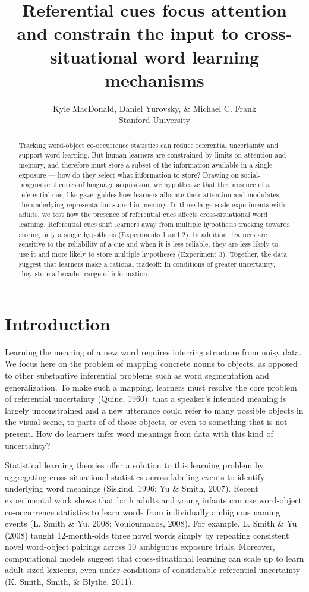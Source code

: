 \documentclass[12pt,]{article}
\title{Referential cues focus attention and constrain the input to
cross-situational word learning mechanisms}
\author{Kyle MacDonald, Daniel Yurovsky, \& Michael C. Frank\\Stanford
University}
\date{}
\begin{document}
\maketitle

\begin{abstract}
Tracking word-object co-occurrence statistics can reduce referential
uncertainty and support word learning. But human learners are
constrained by limits on attention and memory, and therefore must store
a subset of the information available in a single exposure --- how do
they select what information to store? Drawing on social-pragmatic
theories of language acquisition, we hypothesize that the presence of a
referential cue, like gaze, guides how learners allocate their attention
and modulates the underlying representation stored in memory. In three
large-scale experiments with adults, we test how the presence of
referential cues affects cross-situational word learning. Referential
cues shift learners away from multiple hypothesis tracking towards
storing only a single hypothesis (Experiments 1 and 2). In addition,
learners are sensitive to the reliability of a cue and when it is less
reliable, they are less likely to use it and more likely to store
multiple hypotheses (Experiment 3). Together, the data suggest that
learners make a rational tradeoff: In conditions of greater uncertainty,
they store a broader range of information.
\end{abstract}

\newpage

\section{Introduction}\label{introduction}

Learning the meaning of a new word requires inferring structure from
noisy data. We focus here on the problem of mapping concrete nouns to
objects, as opposed to other substantive inferential problems such as
word segmentation and generalization. To make such a mapping, learners
must resolve the core problem of referential uncertainty (Quine, 1960):
that a speaker's intended meaning is largely unconstrained and a new
utterance could refer to many possible objects in the visual scene, to
parts of of those objects, or even to something that is not present. How
do learners infer word meanings from data with this kind of uncertainty?

Statistical learning theories offer a solution to this learning problem
by aggregating cross-situational statistics across labeling events to
identify underlying word meanings (Siskind, 1996; Yu \& Smith, 2007).
Recent experimental work shows that both adults and young infants can
use word-object co-occurrence statistics to learn words from
individually ambiguous naming events (L. Smith \& Yu, 2008; Vouloumanos,
2008). For example, L. Smith \& Yu (2008) taught 12-month-olds three
novel words simply by repeating consistent novel word-object pairings
across 10 ambiguous exposure trials. Moreover, computational models
suggest that cross-situational learning can scale up to learn
adult-sized lexicons, even under conditions of considerable referential
uncertainty (K. Smith, Smith, \& Blythe, 2011).
\end{document}
